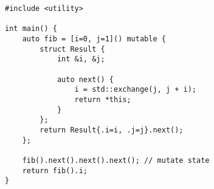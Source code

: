\begin{lstlisting}[title=\href{https://godbolt.org/z/nx8vzq}{\texttt{godbolt.org/z/nx8vzq}}]
#include <utility>

int main() {
    auto fib = [i=0, j=1]() mutable {
        struct Result {
            int &i, &j;

            auto next() {
                i = std::exchange(j, j + i);
                return *this;
            }
        };
        return Result{.i=i, .j=j}.next();
    };

    fib().next().next().next(); // mutate state
    return fib().i;
}
\end{lstlisting}
